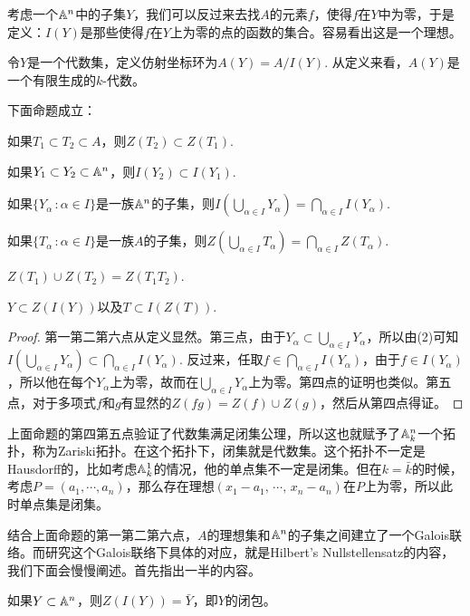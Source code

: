 考虑一个$\mathbb{A}^n$中的子集$Y$，我们可以反过来去找$A$的元素$f$，使得$f$在$Y$中为零，于是定义：$I(Y)$是那些使得$f$在$Y$上为零的点的函数的集合。容易看出这是一个理想。

\para 令$Y$是一个代数集，定义仿射坐标环为$A(Y)=A/I(Y)$. 从定义来看，$A(Y)$是一个有限生成的$k$-代数。

\begin{pro}下面命题成立：
\begin{compactenum}[~~~(1)]
\item 如果$T_1\subset T_2 \subset A$，则$Z(T_2)\subset Z(T_1)$.
\item 如果$Y_1\subset Y_2 \subset \mathbb{A}^n$，则$I(Y_2)\subset I(Y_1)$.
\item 如果$\{Y_\alpha\,:\alpha\in I\}$是一族$\mathbb{A}^n$的子集，则$I\left(\bigcup_{\alpha\in I} Y_\alpha\right)=\bigcap_{\alpha\in I} I(Y_\alpha)$.
\item 如果$\{T_\alpha\,:\alpha\in I\}$是一族$A$的子集，则$Z\left(\bigcup_{\alpha\in I} T_\alpha\right)=\bigcap_{\alpha\in I} Z(T_\alpha)$.
\item $Z(T_1)\cup Z(T_2)=Z(T_1T_2)$.
\item $Y\subset Z(I(Y))$以及$T\subset I(Z(T))$.
\end{compactenum}
\end{pro}

\begin{proof}
	第一第二第六点从定义显然。第三点，由于$Y_\alpha\subset \bigcup_{\alpha\in I} Y_\alpha$，所以由(2)可知$I\left(\bigcup_{\alpha\in I} Y_\alpha\right)\subset\bigcap_{\alpha\in I} I(Y_\alpha)$. 反过来，任取$f\in \bigcap_{\alpha\in I} I(Y_\alpha)$，由于$f\in I(Y_\alpha)$，所以他在每个$Y_\alpha$上为零，故而在$\bigcup_{\alpha\in I} Y_\alpha$上为零。第四点的证明也类似。第五点，对于多项式$f$和$g$有显然的$Z(fg)=Z(f)\cup Z(g)$，然后从第四点得证。
\end{proof}

上面命题的第四第五点验证了代数集满足闭集公理，所以这也就赋予了$\mathbb{A}^n_k$一个拓扑，称为Zariski拓扑。在这个拓扑下，闭集就是代数集。这个拓扑不一定是Hausdorff的，比如考虑$\mathbb{A}^1_k$的情况，他的单点集不一定是闭集。但在$k=\bar{k}$的时候，考虑$P=(a_1,\cdots ,a_n)$，那么存在理想$(x_1-a_1,\,\cdots\!,\,x_n-a_n)$在$P$上为零，所以此时单点集是闭集。

结合上面命题的第一第二第六点，$A$的理想集和$\mathbb{A}^n$的子集之间建立了一个Galois联络。而研究这个Galois联络下具体的对应，就是Hilbert's Nullstellensatz的内容，我们下面会慢慢阐述。首先指出一半的内容。

\begin{pro}
如果$Y \subset \mathbb{A}^n$，则$Z(I(Y))=\bar{Y}$，即$Y$的闭包。
\end{pro}


